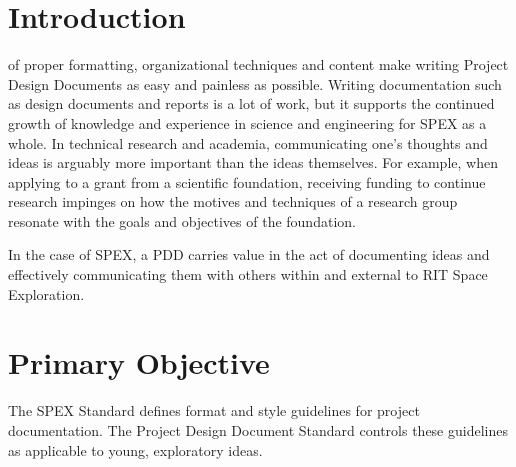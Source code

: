 \documentclass[conference]{IEEEtran} %
\begin{document}

\section{Introduction}
\label{sec:introduction}

 of proper formatting, organizational techniques and content make writing Project Design Documents as easy and painless as possible.
Writing documentation such as design documents and reports is a lot of work, but it supports the continued growth of knowledge and experience in science and engineering for SPEX as a whole.
In technical research and academia, communicating one's thoughts and ideas is arguably more important than the ideas themselves.
For example, when applying to a grant from a scientific foundation, receiving funding to continue research impinges on how the motives and techniques of a research group resonate with the goals and objectives of the foundation.

In the case of SPEX, a PDD carries value in the act of documenting ideas and effectively communicating them with others within and external to RIT Space Exploration.

\section{Primary Objective}
\label{sec:primary-obj}

The SPEX Standard defines format and style guidelines for project documentation. The Project Design Document Standard controls these guidelines as applicable to young, exploratory ideas.
\end{document}
